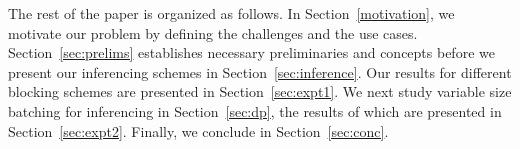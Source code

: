 

The rest of the paper is organized as follows.
In Section~\ref{motivation}, we motivate our problem by defining the challenges and the use cases. 
Section~\ref{sec:prelims} establishes  necessary preliminaries and concepts before we present our 
inferencing schemes in Section~\ref{sec:inference}. Our results for different blocking schemes are presented in Section~\ref{sec:expt1}.  We next study 
variable size batching for  inferencing in Section~\ref{sec:dp}, the results of which are
presented in Section~\ref{sec:expt2}. Finally, we conclude in Section~\ref{sec:conc}.

